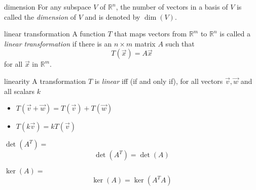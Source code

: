 \documentclass[avery5371,grid,letterpaper]{flashcards}
\newcommand{\Rn}{\mathbb{R}^{n}}
\newcommand{\Rm}{\mathbb{R}^{m}}
\newcommand{\nbym}{n\times m}
\begin{document}
\begin{flashcard}[Definition]{dimension}
For any subspace $V$ of $\Rn$, the number of vectors in a basis of $V$
is called the \textit{dimension} of $V$ and is denoted by $\dim(V)$.
\end{flashcard}



\begin{flashcard}[Definition]{linear transformation}
A function $T$ that maps vectors from $\Rm$ to $\Rn$ is called a
\textit{linear transformation} if there is an $\nbym$ matrix $A$
such that
\begin{displaymath}
T(\vec{x}) = A\vec{x}
\end{displaymath}
for all $\vec{x}$ in $\Rm$.
\end{flashcard}

\begin{flashcard}[Theorem]{linearity}
A transformation $T$ is \textit{linear} iff (if and only if),
for all vectors $\vec{v}, \vec{w}$ and all scalars $k$
\begin{itemize}
\item $T(\vec{v} + \vec{w}) = T(\vec{v}) + T(\vec{w})$
\item $T(k \vec{v}) = k T(\vec{v})$
\end{itemize}
\end{flashcard}

\begin{flashcard}[Theorem]{$\det(A^{T}) = $}
\begin{displaymath}
\det(A^{T}) = \det(A)
\end{displaymath}
\end{flashcard}

\begin{flashcard}[Theorem]{$\ker(A) = $}
\begin{displaymath}
\ker(A) = \ker(A^{T}A)
\end{displaymath}
\end{flashcard}
\end{document}
